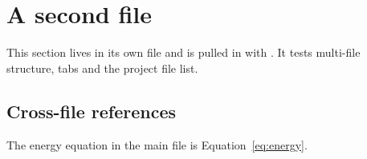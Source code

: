 \section{A second file}
This section lives in its own file and is pulled in with \verb||.
It tests multi-file structure, tabs and the project file list.

\subsection{Cross-file references}
The energy equation in the main file is Equation~\ref{eq:energy}.
